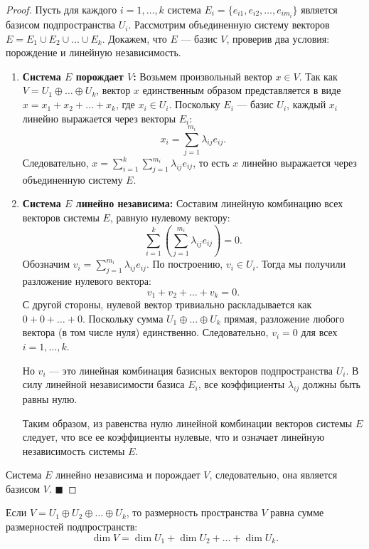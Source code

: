 \begin{proof}
Пусть для каждого $i = 1, \dots, k$ система $E_i = \{e_{i1}, e_{i2}, \dots, e_{im_i}\}$ является базисом подпространства $U_i$. Рассмотрим объединенную систему векторов $E = E_1 \cup E_2 \cup \dots \cup E_k$. Докажем, что $E$ --- базис $V$, проверив два условия: порождение и линейную независимость.

\begin{enumerate}
    \item \textbf{Система $E$ порождает $V$:} 
    Возьмем произвольный вектор $x \in V$. Так как $V = U_1 \oplus \dots \oplus U_k$, вектор $x$ единственным образом представляется в виде $x = x_1 + x_2 + \dots + x_k$, где $x_i \in U_i$. 
    Поскольку $E_i$ --- базис $U_i$, каждый $x_i$ линейно выражается через векторы $E_i$:
    \[
    x_i = \sum_{j=1}^{m_i} \lambda_{ij} e_{ij}.
    \]
    Следовательно, $x = \sum_{i=1}^k \sum_{j=1}^{m_i} \lambda_{ij} e_{ij}$, то есть $x$ линейно выражается через объединенную систему $E$.

    \item \textbf{Система $E$ линейно независима:} 
    Составим линейную комбинацию всех векторов системы $E$, равную нулевому вектору:
    \[
    \sum_{i=1}^k \left( \sum_{j=1}^{m_i} \lambda_{ij} e_{ij} \right) = 0.
    \]
    Обозначим $v_i = \sum_{j=1}^{m_i} \lambda_{ij} e_{ij}$. По построению, $v_i \in U_i$. Тогда мы получили разложение нулевого вектора:
    \[
    v_1 + v_2 + \dots + v_k = 0.
    \]
    С другой стороны, нулевой вектор тривиально раскладывается как $0 + 0 + \dots + 0$. Поскольку сумма $U_1 \oplus \dots \oplus U_k$ прямая, разложение любого вектора (в том числе нуля) единственно. Следовательно, $v_i = 0$ для всех $i = 1, \dots, k$.
    
    Но $v_i$ --- это линейная комбинация базисных векторов подпространства $U_i$. В силу линейной независимости базиса $E_i$, все коэффициенты $\lambda_{ij}$ должны быть равны нулю. 
    
    Таким образом, из равенства нулю линейной комбинации векторов системы $E$ следует, что все ее коэффициенты нулевые, что и означает линейную независимость системы $E$.
\end{enumerate}
Система $E$ линейно независима и порождает $V$, следовательно, она является базисом $V$.
\hfill$\blacksquare$
\end{proof}

\begin{corollary}
Если $V = U_1 \oplus U_2 \oplus \dots \oplus U_k$, то размерность пространства $V$ равна сумме размерностей подпространств:
\[
\dim V = \dim U_1 + \dim U_2 + \dots + \dim U_k.
\]
\end{corollary}
